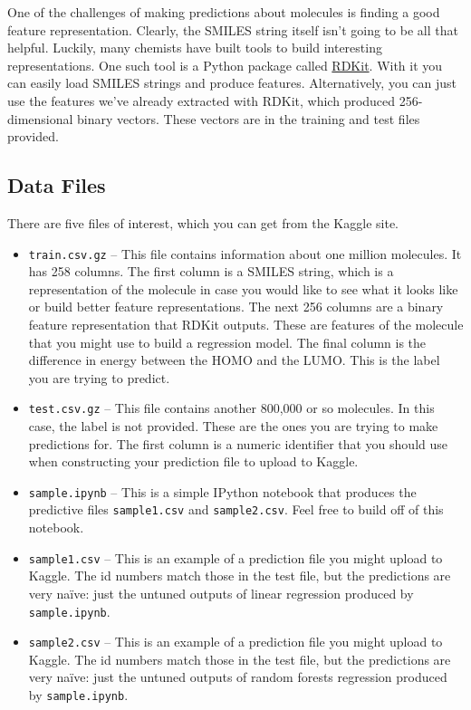 \documentclass[12pt]{article}
\begin{document}
	One of the challenges of making predictions about molecules is finding a good feature representation.  Clearly, the SMILES string itself isn't going to be all that helpful.  Luckily, many chemists have built tools to build interesting representations.  One such tool is a Python package called \href{http://www.rdkit.org/}{RDKit}.  With it you can easily load SMILES strings and produce features. Alternatively, you can just use the features we've already extracted with RDKit, which produced 256-dimensional binary vectors.  These vectors are in the training and test files provided.
	
	\subsection*{Data Files}
	There are five files of interest, which you can get from the Kaggle site. 
	\begin{itemize}
		\item \verb|train.csv.gz| -- This file contains information about one million molecules.  It has 258 columns.  The first column is a SMILES string, which is a representation of the molecule in case you would like to see what it looks like or build better feature representations. The next 256 columns are a binary feature representation that RDKit outputs.  These are features of the molecule that you might use to build a regression model.  The final column is the difference in energy between the HOMO and the LUMO.  This is the label you are trying to predict.
		\item \verb|test.csv.gz| -- This file contains another 800,000 or so molecules.  In this case, the label is not provided.  These are the ones you are trying to make predictions for. The first column is a numeric identifier that you should use when constructing your prediction file to upload to Kaggle.
		\item \verb|sample.ipynb| -- This is a simple IPython notebook that produces the predictive files \verb|sample1.csv| and \verb|sample2.csv|.  Feel free to build off of this notebook.
		\item \verb|sample1.csv| -- This is an example of a prediction file you might upload to Kaggle.  The id numbers match those in the test file, but the predictions are very na\"ive: just the untuned outputs of linear regression produced by \verb|sample.ipynb|.
		\item \verb|sample2.csv| -- This is an example of a prediction file you might upload to Kaggle.  The id numbers match those in the test file, but the predictions are very na\"ive: just the untuned outputs of random forests regression produced by \verb|sample.ipynb|.
	\end{itemize}
	
\end{document}
